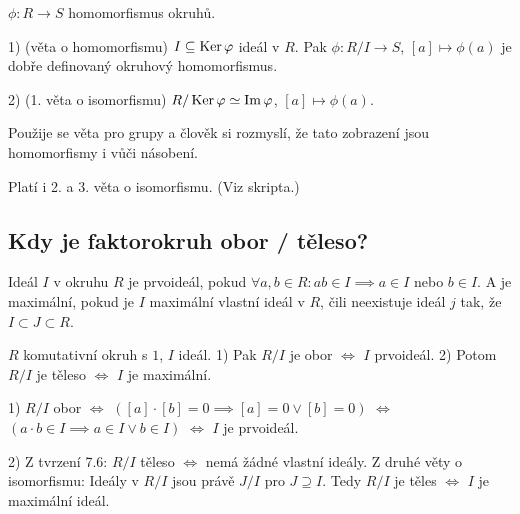 \documentclass[12pt]{article}                   %
\begin{document}
        \begin{veta}
            $\phi: R \rightarrow S$ homomorfismus okruhů.

            1) (věta o homomorfismu) $I \subseteq \operatorname{Ker} \varphi$ ideál v $R$. Pak $\phi: R/I \rightarrow S$, $[a] \mapsto \phi(a)$ je dobře definovaný okruhový homomorfismus.

            2) (1. věta o isomorfismu) $R / \operatorname{Ker} \varphi \simeq \operatorname{Im} \varphi$, $[a] \mapsto \phi(a)$.

            \begin{dukazin}
                Použije se věta pro grupy a člověk si rozmyslí, že tato zobrazení jsou homomorfismy i vůči násobení.
            \end{dukazin}
        \end{veta}

        \begin{poznamka}
            Platí i 2. a 3. věta o isomorfismu. (Viz skripta.)
        \end{poznamka}

    \subsection{Kdy je faktorokruh obor / těleso?}
        \begin{definice}
            Ideál $I$ v okruhu $R$ je prvoideál, pokud $\forall a, b \in R: ab \in I \implies a \in I$ nebo $b \in I$. A je maximální, pokud je $I$ maximální vlastní ideál v $R$, čili neexistuje ideál $j$ tak, že $I \subset J \subset R$.
        \end{definice}

        \begin{veta}
            $R$ komutativní okruh s $1$, $I$ ideál. 1) Pak $R/I$ je obor $\Leftrightarrow$ $I$ prvoideál. 2) Potom $R/I$ je těleso $\Leftrightarrow$ $I$ je maximální.

            \begin{dukazin}
                1) $R/I$ obor $\Leftrightarrow$ $([a]·[b] = 0 \implies [a] = 0 \lor [b] = 0)$ $\Leftrightarrow$ $(a·b \in I \implies a \in I \lor b \in I)$ $\Leftrightarrow$ $I$ je prvoideál.

                2) Z tvrzení 7.6: $R/I$ těleso $\Leftrightarrow$ nemá žádné vlastní ideály. Z druhé věty o isomorfismu: Ideály v $R/I$ jsou právě $J/I$ pro $J \supseteq I$. Tedy $R/I$ je těles $\Leftrightarrow$ $I$ je maximální ideál.
            \end{dukazin}
        \end{veta}
\end{document}
